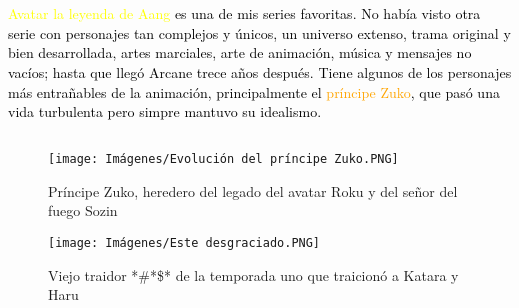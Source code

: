 \documentclass[a5paper,11pt]{article}
\begin{document}
\section{}
    \subsection*{\sf{\textit{\textcolor{Apricot}{¿Why?}}}}
    \textsf{\textcolor{black}{{\textcolor{Yellow}{Avatar la leyenda de Aang}} es una de mis series favoritas. No había visto otra serie con personajes tan complejos y únicos, un universo extenso, trama original y bien desarrollada, artes marciales, arte de animación, música y mensajes no vacíos; hasta que llegó {\textcolor{CarnationPink}{Arcane}} trece años después. Tiene algunos de los personajes más entrañables de la animación, principalmente el {\textcolor{Orange}{príncipe Zuko}}, que pasó una vida turbulenta pero simpre mantuvo su idealismo.}}
    \subsection*{\sf{\textit{\textcolor{Apricot}{El mejor y el peor}}}}
     \begin{SCfigure}[]
        \caption{Príncipe Zuko, heredero del legado del avatar Roku y del señor del fuego Sozin}
        \texttt{[image: Imágenes/Evolución del príncipe Zuko.PNG]}
    \end{SCfigure}
    
     \begin{SCfigure}[]
        \caption{Viejo traidor *\#*\$* de la temporada uno que traicionó a Katara y Haru}
        \texttt{[image: Imágenes/Este desgraciado.PNG]}
    \end{SCfigure}

\end{document}
